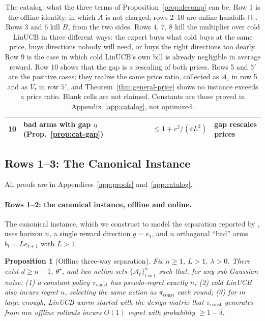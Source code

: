 \documentclass{article}
\newtheorem{proposition}{Proposition}
\theoremstyle{definition}
\theoremstyle{remark}
\newcommand{\eps}{\varepsilon}
\theoremstyle{remark}
\newcommand{\Hyb}{\mathsf{H}}
\begin{document}
\begin{table}[t]
\begin{tabular}{@{}clccccl@{}}
10 & bad arms with gap $\eta$ (Prop.~\ref{prop:cat-gap}) & & & & $\le1+c^2/(\eps L^2)$ & gap rescales prices\\
\bottomrule
\end{tabular}
\caption{The catalog: what the three terms of Proposition~\ref{prop:decomp} can be.
Row 1 is the offline identity, in which $A$ is not charged; rows 2--10 are
online handoffs $\Hyb_\tau$. Rows 3 and 6 kill $B_\tau$ from the two sides.
Rows 4, 7, 8 kill the multiplier over cold LinUCB in three different ways:
the expert buys what cold buys at the same price, buys directions nobody will
need, or buys the right directions too dearly. Row 9 is the case in which cold
LinUCB's own bill is already negligible in average reward. Row 10 shows that
the gap is a rescaling of both prices. Rows 5 and $5'$ are the positive
cases; they realize the same price ratio, collected as $A_\tau$ in row 5 and
as $V_\tau$ in row $5'$, and Theorem~\ref{thm:general-price} shows no
instance exceeds a price ratio. Blank cells are not claimed. Constants are
those proved in Appendix~\ref{app:catalog}, not optimized.}
\label{tab:catalog}
\end{table}


\subsection{Rows 1--3: The Canonical Instance}
\label{sec:canonical}

All proofs are in Appendices~\ref{app:proofs} and~\ref{app:catalog}.


\paragraph{Rows 1--2: the canonical instance, offline and online.}
The canonical instance, which we construct to model the separation reported
by \cite{chen2024llmdecision}, uses
horizon $n$, a single reward direction $g=e_1$, and $n$ orthogonal ``bad''
arms $b_t=Le_{t+1}$ with $L>1$.

\begin{proposition}[Offline three-way separation]
\label{prop:three-way}
Fix $n\ge1$, $L>1$, $\lambda>0$. There exist $d\ge n+1$, $\theta^\star$, and
two-action sets $\{\mathcal A_t\}_{t=1}^n$ such that, for any sub-Gaussian
noise: (1) a constant policy $\pi_{\mathrm{const}}$ has pseudo-regret exactly
$n$; (2) cold LinUCB also incurs regret $n$, selecting the same action as
$\pi_{\mathrm{const}}$ each round; (3) for $m$ large enough, LinUCB
warm-started with the design matrix that $\pi_{\mathrm{const}}$ generates from
$mn$ \emph{offline} rollouts incurs $O(1)$ regret with probability $\ge1-\delta$.
\end{proposition}
\end{document}
